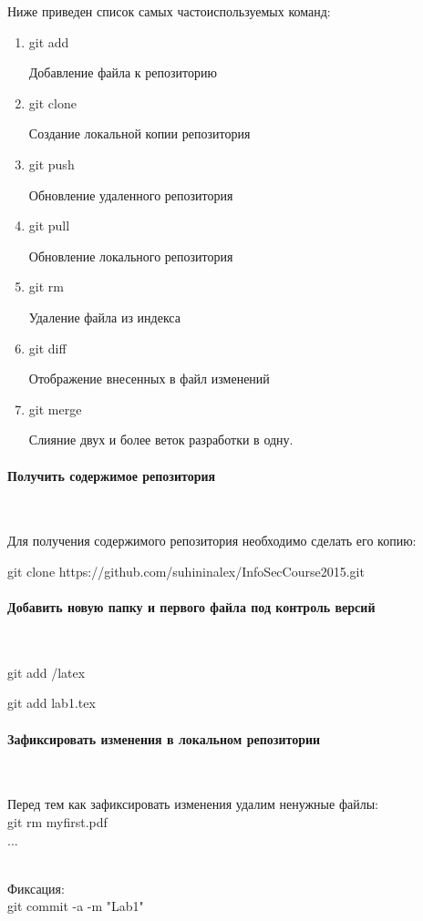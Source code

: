 \documentclass{article}
\begin{document}
Ниже приведен список самых частоиспользуемых команд:
\begin{enumerate}
\item git add

Добавление файла к репозиторию

\item git clone

Создание локальной копии репозитория

\item git push

Обновление удаленного репозитория

\item git pull

Обновление локального репозитория

\item git rm

Удаление файла из индекса

\item git diff

Отображение внесенных в файл изменений

\item git merge 

Слияние двух и более веток разработки в одну.
\end{enumerate}

\paragraph{Получить содержимое репозитория}
~

Для получения содержимого репозитория необходимо сделать его копию:

git clone https://github.com/suhininalex/InfoSecCourse2015.git

\paragraph{Добавить новую папку и первого файла под контроль версий}
~

git add /latex

git add lab1.tex

\paragraph{Зафиксировать изменения в локальном репозитории}
~

Перед тем как зафиксировать изменения удалим ненужные файлы: \\
git rm myfirst.pdf \\
...	\\
~

Фиксация: \\
git commit -a -m "Lab1" \\
\end{document}
